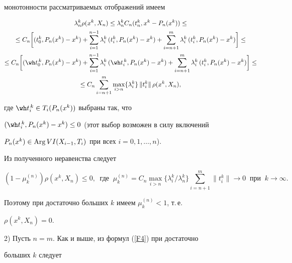 \begin{pf}
монотонности рассматриваемых отображений имеем


\begin{multline*}


\lambda_n^k\rho(x^k, X_n)\le \lambda_n^kC_n(t_n^k,x^k-P_n(x^k))\le \\


%


\le C_n \bigg[ (t_0^k,


P_n(x^k)-x^k)+\sum^{n-1}_{i=1} \lambda_i^k\, (t_i^k, P_n(x^k)-x^k) +


\sum^m_{i=n+1} \lambda_i^k \, (t_i^k, P_n(x^k)-x^k) \bigg]\le \\


%


\le C_n \bigg[(\wh t_0^{\,k}, P_n(x^k)-x^k) +\sum^{n-1}_{i=1}


\lambda_i^k \,(\wh t_i^{\,k}, P_n(x^k)-x^k) + \sum^m_{i=n+1} \lambda_i^k


\,(t_i^k, P_n(x^k)-x^k) \bigg]\le \\


%


\le C_n\sum^m_{i=n+1}\max_{i>n}\{\lambda_i^k\}\,\|t_i^k\|\,


\rho(x^k, X_n),


\end{multline*}


где $\wh t_i^{\,k}\in T_i(P_n(x^k))$ выбраны так, что


$(\wh t_i^{\,k},P_n(x^k)-x^k)\le 0$ (этот выбор возможен в силу включений


$P_n(x^k)\in\operatorname{Arg} VI (X_{i-1}, T_i)$ при всех $i=0,1,\dotsc,n$).


Из полученного неравенства следует


$$


(1-\mu^{(n)}_k) \rho(x^k, X_n)\le 0,\ \text{ где }


\ \mu^{(n)}_k=C_n\max_{i>n} \{\lambda_i^k/ \lambda^k_n\}


\sum^m_{i=n+1}\|t_i^k\|\to 0\ \text{ при }\ k\to\infty.


$$


Поэтому при достаточно больших $k$ имеем $\mu^{(n)}_k<1$, т.\,е.


$\rho(x^k, X_n)=0$.





2) Пусть $n=m$. Как и выше, из формул (\ref{F4}) при достаточно


больших $k$ следует


\begin{multline*}



\end{multline*}
\end{pf}
